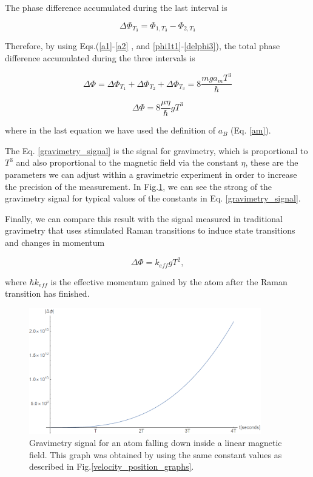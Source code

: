 \documentclass{article}
\begin{document}
The phase difference accumulated during the last interval is

\begin{equation}\label{delphi3}
\Delta \Phi_{T_{3}} = \Phi_{1, T_{3}} - \Phi_{2, T_{3}}
\end{equation}

Therefore, by using Eqs.(\ref{a1}-\ref{a2} , and \ref{phi1t1}-\ref{delphi3}), the total phase difference accumulated during the three intervals is

\begin{equation}
\Delta \Phi = \Delta \Phi_{T_{1}} + \Delta \Phi_{T_{2}} + \Delta \Phi_{T_{3}} = 8 \frac{mga_{m}T^3}{\hbar}
\end{equation}

\begin{equation}\label{gravimetry_signal}
\Delta \Phi = 8 \frac{\mu \eta}{\hbar} g T^3
\end{equation}

where in the last equation we have used the definition of $a_B$ (Eq. \ref{am}). 

The Eq. \ref{gravimetry_signal} is the signal for gravimetry, which is proportional to $T^3$ and also proportional to the magnetic field via the constant $\eta$, these are the parameters we can adjust within a gravimetric experiment in order to increase the precision of the measurement. In Fig.\ref{phase_graph}, we can see the strong of the gravimetry signal for typical values of the constants in Eq. \ref{gravimetry_signal}. 

Finally, we can compare this result with the signal measured in traditional gravimetry that uses stimulated Raman transitions to induce state transitions and changes in momentum \cite{Peters_2001}

\begin{equation}\label{traditional_gravimetry_signal}
\Delta \Phi = k_{eff} g T^2 ,
\end{equation}

where $\hbar k_{eff}$ is the effective momentum gained by the atom after the Raman transition has finished.

\begin{figure}
\centering
\includegraphics[width=0.9\textwidth]{fase.png}
\caption{Gravimetry signal for an atom falling down inside a linear magnetic field. This graph was obtained by using the same constant values as described in Fig.\ref{velocity_position_graphs}.}
\label{phase_graph}
\end{figure}
\end{document}
